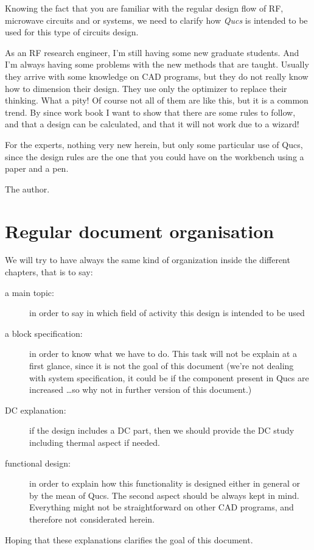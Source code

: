 %
%
%
%


Knowing the fact that you are familiar with the regular design flow of
RF, microwave circuits and or systems, we need to clarify how
\textit{Qucs} is intended to be used for this type of circuits design.
 
\bigskip

As an RF research engineer, I'm still having some new graduate
students.  And I'm always having some problems with the new methods
that are taught.  Usually they arrive with some knowledge on CAD
programs, but they do not really know how to dimension their design.
They use only the optimizer to replace their thinking.  What a pity!
Of course not all of them are like this, but it is a common trend.  By
since work book I want to show that there are some rules to follow,
and that a design can be calculated, and that it will not work due to
a wizard!

\bigskip

For the experts, nothing very new herein, but only some particular use
of Qucs, since the design rules are the one that you could have on the
workbench using a paper and a pen.

\bigskip

The author.

\section*{Regular document organisation}

We will try to have always the same kind of organization inside the
different chapters, that is to say:

\begin{description}
\item[a main topic: ] in order to say in which field of activity this design is intended to be used

\item[a block specification: ] in order to know what we have to do.  This task will not be explain at a first glance, since it is not the goal of this document (we're not dealing with system specification, it could be if the component present in Qucs are increased \ldots so why not in further version of this document.)

\item[DC explanation: ] if the design includes a DC part, then we should provide the DC study including thermal aspect if needed.

\item[functional design: ] in order to explain how this functionality is designed either in general or by the mean of Qucs.  The second aspect should be always kept in mind.  Everything might not be straightforward on other CAD programs, and therefore not considerated herein.

\end{description}

\bigskip

Hoping that these explanations clarifies the goal of this document.
